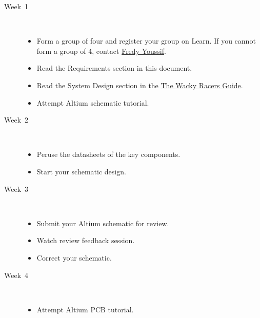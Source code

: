 \documentclass[11pt, a4paper]{article}
\makeatletter
\newcommand{\fredy}{\href{mailto:fredy.youssif@pg.canterbury.ac.nz}{Fredy Youssif}}
\newcommand{\theguide}{\href{https://eng-git.canterbury.ac.nz/wacky-racers/wacky-racers/-/blob/master/doc/guide/guide.pdf}{The Wacky Racers Guide}}
\makeatother
\begin{document}
\begin{description}
\item [Week~1]\mbox{}\\[-0.4cm]

  \begin{itemize}
  \item Form a group of four and register your group on Learn.  If you
    cannot form a group of 4, contact \fredy.

  \item Read the Requirements section in this document.

  \item Read the System Design section in the \theguide.

  \item Attempt Altium schematic tutorial.

  \end{itemize}

\item [Week~2]\mbox{}\\[-0.4cm]

  \begin{itemize}
  \item Peruse the datasheets of the key components.

  \item Start your schematic design.

  \end{itemize}

\item [Week~3]\mbox{}\\[-0.4cm]

  \begin{itemize}

  \item Submit your Altium schematic for review.

  \item Watch review feedback session.

  \item Correct your schematic.

  \end{itemize}

\item [Week~4]\mbox{}\\[-0.4cm]

  \begin{itemize}
  \item Attempt Altium PCB tutorial.


\end{itemize}
\end{description}
\end{document}
